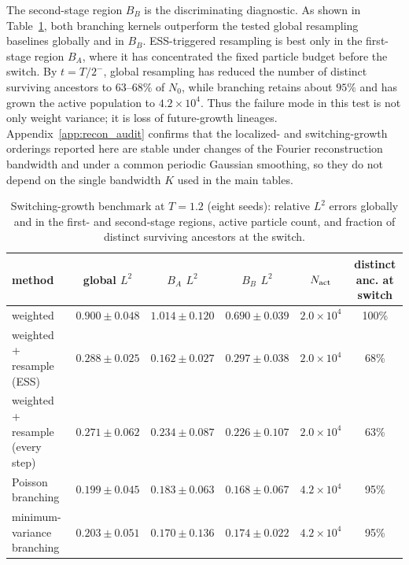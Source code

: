 \documentclass[a4paper,fleqn]{cas-sc}
\theoremstyle{definition}
\theoremstyle{remark}
\begin{document}
The second-stage region $B_B$ is the discriminating diagnostic.  As shown in Table~\ref{tab:switch}, both branching kernels outperform the tested global resampling baselines globally and in $B_B$.  ESS-triggered resampling is best only in the first-stage region $B_A$, where it has concentrated the fixed particle budget before the switch.  By $t=T/2^-$, global resampling has reduced the number of distinct surviving ancestors to $63$--$68\%$ of $N_0$, while branching retains about $95\%$ and has grown the active population to $4.2\times10^4$.  Thus the failure mode in this test is not only weight variance; it is loss of future-growth lineages.  Appendix~\ref{app:recon_audit} confirms that the localized- and switching-growth orderings reported here are stable under changes of the Fourier reconstruction bandwidth and under a common periodic Gaussian smoothing, so they do not depend on the single bandwidth $K$ used in the main tables.

\begin{table}[t]
\centering
\caption{Switching-growth benchmark at $T=1.2$ (eight seeds): relative $L^2$ errors globally and in the first- and second-stage regions, active particle count, and fraction of distinct surviving ancestors at the switch.}
\label{tab:switch}
\begin{tabular}{l c c c c c}
\toprule
method & global $L^2$ & $B_A$ $L^2$ & $B_B$ $L^2$ & $N_{\rm act}$ & distinct anc. at switch \\
\midrule
weighted & $0.900\pm0.048$ & $1.014\pm0.120$ & $0.690\pm0.039$ & $2.0\times10^4$ & 100\% \\
weighted + resample (ESS) & $0.288\pm0.025$ & $\mathbf{0.162\pm0.027}$ & $0.297\pm0.038$ & $2.0\times10^4$ & 68\% \\
weighted + resample (every step) & $0.271\pm0.062$ & $0.234\pm0.087$ & $0.226\pm0.107$ & $2.0\times10^4$ & 63\% \\
Poisson branching & $\mathbf{0.199\pm0.045}$ & $0.183\pm0.063$ & $\mathbf{0.168\pm0.067}$ & $4.2\times10^4$ & 95\% \\
minimum-variance branching & $0.203\pm0.051$ & $0.170\pm0.136$ & $0.174\pm0.022$ & $4.2\times10^4$ & 95\% \\
\bottomrule
\end{tabular}
\end{table}
\end{document}
